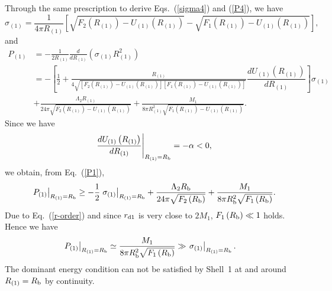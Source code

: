 \documentclass[aps,preprint,preprintnumber,nofootinbib,amsmath,amssymb,ascmac,bm,12pt]{revtex4}
\newcommand{\rdo}{r_{\rm d1}}
\newcommand{\Rb}{R_{\rm b}}
\newcommand{\Rf}{R_{\rm f}}
\newcommand{\Ron}{R_{(1)}}
\newcommand{\Uon}{U_{(1)}}
\begin{document}
Through the same prescription to derive Eqs.~(\ref{sigma4}) and (\ref{P4}), we have 
\begin{equation}
\sigma_{(1)}=\frac{1}{4\pi\Ron}\left[\sqrt{F_2\left(\Ron\right)-\Uon\left(\Ron\right)}
-\sqrt{F_1\left(\Ron\right)-\Uon\left(\Ron\right)}\right], \label{sigma1}
\end{equation}
and
\begin{align}
P_{(1)}
&=-\frac{1}{2\Ron}\frac{d}{d\Ron}\left(\sigma_{(1)}\Ron^2\right) \nonumber \\
&=-\left[\frac{1}{2}+\frac{\Ron}
{4\sqrt{\left[F_2\left(\Ron\right)-\Uon\left(\Ron\right)\right]\left[F_1\left(\Ron\right)-\Uon\left(\Ron\right)\right]}}
\dfrac{d\Uon\left(\Ron\right)}{d\Ron}\right]\sigma_{(1)} \nonumber \\
&+\frac{\Lambda_2\Ron}{24\pi\sqrt{F_2\left(\Ron\right)-\Uon\left(\Ron\right)}}
+\frac{M_1}{8\pi\Ron^2\sqrt{F_1\left(\Ron\right)-\Uon\left(\Ron\right)}}. \label{P1}
\end{align}
Since we have
$$
\left.\frac{d\Uon\left(\Ron\right)}{d\Ron}\right|_{\Ron=\Rb} =-\alpha < 0,
$$
we obtain, from Eq.~(\ref{P1}), 
\begin{align}
\left.P_{(1)}\right|_{\Ron=\Rb}\geq-\frac{1}{2}\left.\sigma_{(1)}\right|_{\Ron=\Rb}
+\frac{\Lambda_2\Rb}{24\pi\sqrt{F_2\left(\Rb\right)}}
+\frac{M_1}{8\pi\Rb^2\sqrt{F_1\left(\Rb\right)}}. 
\end{align}
Due to Eq.~(\ref{r-order}) and since $\rdo$ is very close to $2M_1$, $F_1\left(\Rb\right)\ll1$ holds.  
Hence we have
\begin{align}
\left.P_{(1)}\right|_{\Ron=\Rb}
&\simeq \frac{M_1}{8\pi\Rb^2\sqrt{F_1\left(\Rb\right)}} \gg \left.\sigma_{(1)}\right|_{\Ron=\Rb}. \nonumber
\end{align}
The dominant energy condition can not be satisfied by Shell~1 at and around $\Ron=\Rb$ by continuity.  



\end{document}

